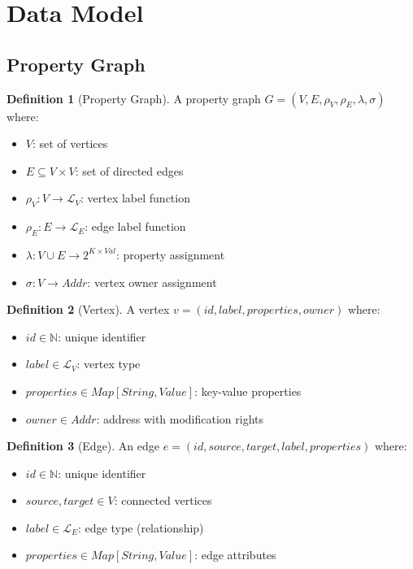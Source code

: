 \documentclass[11pt,a4paper]{article}
\theoremstyle{definition}
\newtheorem{definition}{Definition}
\begin{document}
\section{Data Model}

\subsection{Property Graph}

\begin{definition}[Property Graph]
A property graph $G = (V, E, \rho_V, \rho_E, \lambda, \sigma)$ where:
\begin{itemize}
    \item $V$: set of vertices
    \item $E \subseteq V \times V$: set of directed edges
    \item $\rho_V: V \to \mathcal{L}_V$: vertex label function
    \item $\rho_E: E \to \mathcal{L}_E$: edge label function
    \item $\lambda: V \cup E \to 2^{K \times Val}$: property assignment
    \item $\sigma: V \to Addr$: vertex owner assignment
\end{itemize}
\end{definition}

\begin{definition}[Vertex]
A vertex $v = (id, label, properties, owner)$ where:
\begin{itemize}
    \item $id \in \mathbb{N}$: unique identifier
    \item $label \in \mathcal{L}_V$: vertex type
    \item $properties \in Map[String, Value]$: key-value properties
    \item $owner \in Addr$: address with modification rights
\end{itemize}
\end{definition}

\begin{definition}[Edge]
An edge $e = (id, source, target, label, properties)$ where:
\begin{itemize}
    \item $id \in \mathbb{N}$: unique identifier
    \item $source, target \in V$: connected vertices
    \item $label \in \mathcal{L}_E$: edge type (relationship)
    \item $properties \in Map[String, Value]$: edge attributes
\end{itemize}
\end{definition}
\end{document}
